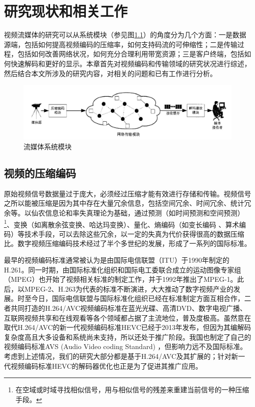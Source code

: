 \chapter{研究现状和相关工作}

视频流媒体的研究可以从系统模块（参见图\ref{fig:01}）的角度分为几个方面：一是数据源端，包括如何提高视频编码的压缩率，如何支持码流的可伸缩性；二是传输过程，包括如何改善网络状况，如何充分合理利用带宽资源；三是客户终端，包括如何快速解码和更好的显示。本章首先对视频编码和传输领域的研究状况进行综述，然后结合本文所涉及的研究内容，对相关的问题和已有工作进行分析。

\begin{figure}[h]
	\centering
	\includegraphics[width = 0.9\linewidth]{clip/01.png}
	\caption{流媒体系统模块 \label{fig:01}}
\end{figure}

\section{视频的压缩编码}

原始视频信号数据量过于庞大，必须经过压缩才能有效进行存储和传输。视频信号之所以能被压缩是因为其中存在大量冗余信息，包括空间冗余、时间冗余、统计冗余等\supercite{Gao-book-2010}。以仙农信息论\supercite{Shannon-1948}和率失真理论\supercite{Berger-book-1984}为基础，通过预测（如时间预测和空间预测）\footnote{在空域或时域寻找相似信号，用与相似信号的残差来重建当前信号的一种压缩手段。}、变换（如离散余弦变换\supercite{Rao-1990}、哈达玛变换\supercite{Pratt-1969}）、量化\supercite{Gray-TIT1997}、熵编码（如变长编码\supercite{Huffman-1952} 、算术编码\supercite{Rissanen-1979}）等技术手段，可以去除这些冗余，以一定的失真为代价获得很高的数据压缩比。数字视频压缩编码技术经过了半个多世纪的发展，形成了一系列的国际标准。

最早的视频编码标准通常被认为是由国际电信联盟（ITU）于1990年制定的H.261\supercite{H.261}。同一时期，由国际标准化组织和国际电工委联合成立的运动图像专家组（MPEG）也开始了视频相关标准的制定工作，并于1992年推出了MPEG-1\supercite{MPEG1}。此后，以MPEG-2\supercite{MPEG2}、H.263\supercite{H.263}为代表的标准不断演进，大大推动了数字视频产业的发展。时至今日，国际电信联盟与国际标准化组织已经在标准制定方面互相合作，二者共同打造的H.264/AVC视频编码标准\supercite{H.264}在蓝光光碟、高清DVD、数字电视广播、互联网视频共享和在线观看等各个领域都占据了主流地位，普及度极高。虽然意在取代H.264/AVC的新一代视频编码标准HEVC已经于2013年发布，但因为其编解码复杂度高且大多设备和系统尚未支持，所以还处于推广阶段。我国也制定了自己的视频编码标准AVS (Audio Video coding Standard) \supercite{AVS}，但影响力远不及国际标准。考虑到上述情况，我们的研究大部分都是基于H.264/AVC及其扩展的；针对新一代视频编码标准HEVC的解码器优化也正是为了促进其推广应用。

